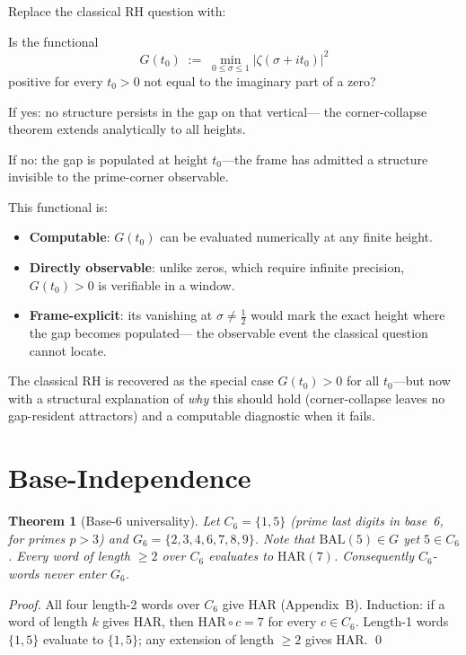 \documentclass[11pt]{article}
\newtheorem{theorem}{Theorem}
\begin{document}
Replace the classical RH question with:

\begin{tcolorbox}[colback=blue!5,colframe=black!70,
  title={The gap-positivity question}]
Is the functional
\[
  G(t_0) \;:=\; \min_{0\le\sigma\le1}|\zeta(\sigma+it_0)|^2
\]
positive for every $t_0>0$ not equal to the imaginary part of a zero?

If yes: no structure persists in the gap on that vertical---
the corner-collapse theorem extends analytically to all heights.

If no: the gap is populated at height $t_0$---the frame has admitted
a structure invisible to the prime-corner observable.
\end{tcolorbox}

This functional is:
\begin{itemize}
\item \textbf{Computable}: $G(t_0)$ can be evaluated numerically
      at any finite height.
\item \textbf{Directly observable}: unlike zeros, which require
      infinite precision, $G(t_0)>0$ is verifiable in a window.
\item \textbf{Frame-explicit}: its vanishing at $\sigma\ne\tfrac12$
      would mark the exact height where the gap becomes populated---
      the observable event the classical question cannot locate.
\end{itemize}

The classical RH is recovered as the special case $G(t_0)>0$
for all $t_0$---but now with a structural explanation of \emph{why}
this should hold (corner-collapse leaves no gap-resident
attractors) and a computable diagnostic when it fails.

\section{Base-Independence}

\begin{theorem}[Base-6 universality]\label{thm:base6}
Let $C_6=\{1,5\}$ (prime last digits in base~6, for primes $p>3$)
and $G_6=\{2,3,4,6,7,8,9\}$.
Note that $\mathrm{BAL}(5)\in G$ yet $5\in C_6$.
Every word of length $\ge2$ over $C_6$ evaluates to $\mathrm{HAR}(7)$.
Consequently $C_6$-words never enter $G_6$.
\end{theorem}

\begin{proof}
All four length-2 words over $C_6$ give HAR (Appendix~B).
Induction: if a word of length $k$ gives HAR, then
$\mathrm{HAR}\circ c=7$ for every $c\in C_6$.
Length-1 words $\{1,5\}$ evaluate to $\{1,5\}$; any extension
of length $\ge2$ gives HAR. \qed
\end{proof}
\end{document}

